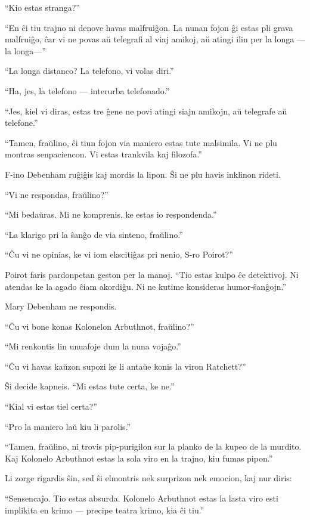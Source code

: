 ``Kio estas stranga?''

``En ĉi tiu trajno ni denove havas malfruiĝon. La nunan fojon ĝi estas pli grava malfruiĝo, ĉar vi ne povas aŭ telegrafi al viaj amikoj, aŭ atingi ilin per la longa --- la longa---''

``La longa distanco? La telefono, vi volas diri.''

``Ha, jes, la telefono --- interurba telefonado.''

``Jes, kiel vi diras, estas tre ĝene ne povi atingi siajn amikojn, aŭ telegrafe aŭ telefone.''

``Tamen, fraŭlino, ĉi tiun fojon via maniero estas tute malsimila. Vi ne plu montras senpaciencon. Vi estas trankvila kaj filozofa.''

F-ino Debenham ruĝiĝis kaj mordis la lipon. Ŝi ne plu havis inklinon rideti.

``Vi ne respondas, fraŭlino?''

``Mi bedaŭras. Mi ne komprenis, ke estas io respondenda.''

``La klarigo pri la ŝanĝo de via sinteno, fraŭlino.''

``Ĉu vi ne opinias, ke vi iom ekscitiĝas pri nenio, S-ro Poirot?''

Poirot faris pardonpetan geston per la manoj. ``Tio estas kulpo ĉe detektivoj. Ni atendas ke la agado ĉiam akordiĝu. Ni ne kutime konsideras humor-ŝanĝojn.''

Mary Debenham ne respondis.

``Ĉu vi bone konas Kolonelon Arbuthnot, fraŭlino?''

``Mi renkontis lin unuafoje dum la nuna vojaĝo.''

``Ĉu vi havas kaŭzon supozi ke li antaŭe konis la viron Ratchett?''

Ŝi decide kapneis. ``Mi estas tute certa, ke ne.''

``Kial vi estas tiel certa?''

``Pro la maniero laŭ kiu li parolis.''

``Tamen, fraŭlino, ni trovis pip-purigilon sur la planko de la kupeo de la murdito. Kaj Kolonelo Arbuthnot estas la sola viro en la trajno, kiu fumas pipon.''

Li zorge rigardis ŝin, sed ŝi elmontris nek surprizon nek emocion, kaj nur diris:

``Sensencaĵo. Tio estas absurda. Kolonelo Arbuthnot estas la lasta viro esti implikita en krimo --- precipe teatra krimo, kia ĉi tiu.''

